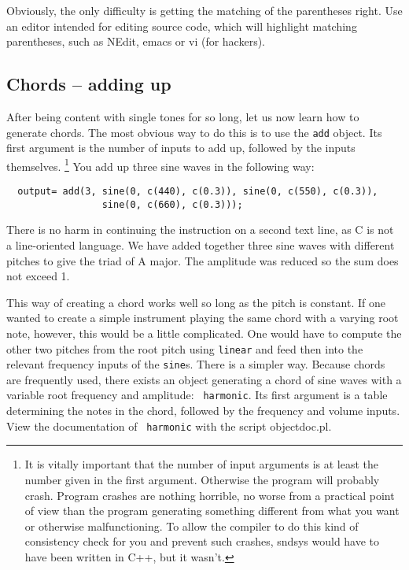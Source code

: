 \documentclass{article}
\def\s{{\sc sndsys} }
\def\bv{\begin{verbatim}}
\begin{document}
Obviously, the only difficulty is getting the matching of the parentheses
right.  Use an editor intended for editing source code, which will highlight
matching parentheses, such as NEdit, emacs or vi (for hackers).



\subsection{Chords -- adding up}

After being content with single tones for so long, let us now learn how to
generate chords.  The most obvious way to do this is to use the {\tt add}
object.  Its first argument is the number of inputs to add up, followed by the
inputs themselves.%
%
\footnote{It is vitally important that the number of input arguments is at
least the number given in the first argument.  Otherwise the program will
probably crash.  Program crashes are nothing horrible, no worse from a
practical point of view than the program generating something different from
what you want or otherwise malfunctioning.  To allow the compiler to do this
kind of consistency check for you and prevent such crashes, \s would have to
have been written in C++, but it wasn't.}
%
You add up three sine waves in the following way:

\bv
  output= add(3, sine(0, c(440), c(0.3)), sine(0, c(550), c(0.3)),
                 sine(0, c(660), c(0.3)));
\end{verbatim}

There is no harm in continuing the instruction on a second text line, as C is
not a line-oriented language.  We have added together three sine waves with
different pitches to give the triad of A major.  The amplitude was reduced so
the sum does not exceed 1.

This way of creating a chord works well so long as the pitch is constant.  If
one wanted to create a simple instrument playing the same chord with a varying
root note, however, this would be a little complicated.  One would have to
compute the other two pitches from the root pitch using {\tt linear} and feed
then into the relevant frequency inputs of the {\tt sine}s.  There is a simpler
way.  Because chords are frequently used, there exists an object generating
a chord of sine waves with a variable root frequency and amplitude: {\tt
harmonic}.  Its first argument is a table determining the notes in the chord,
followed by the frequency and volume inputs.  View the documentation of {\tt
harmonic} with the script objectdoc.pl.
\end{document}
